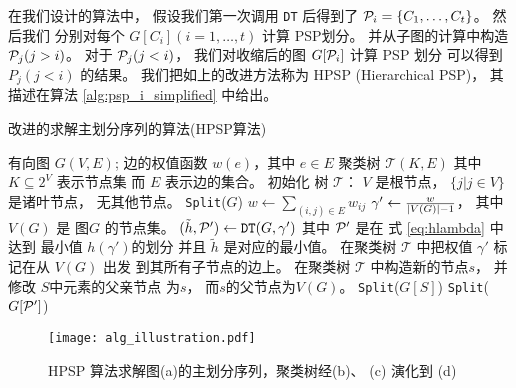 在我们设计的算法中，
假设我们第一次调用 \texttt{DT} 后得到了
$\P_i = \{C_1, \dots, C_t\}$。
然后我们 分别对每个
$G[C_i](i=1,\dots, t)$
计算 PSP划分。
并从子图的计算中构造 $\P_j(j>i)$。
对于 $\P_j(j<i)$，
我们对收缩后的图 $G[\P_i]$ 计算 PSP 划分
可以得到  $P_j(j<i)$ 的结果。
我们把如上的改进方法称为 HPSP (Hierarchical PSP)，
其描述在算法 \ref{alg:psp_i_simplified} 中给出。

\begin{algorithm}[!ht]
	\caption{改进的求解主划分序列的算法(HPSP算法)}\label{alg:psp_i_simplified}
	\begin{algorithmic}[1]
		\REQUIRE 有向图 $G(V, E)$; 边的权值函数 $w(e)$，其中 $e\in E$
		\ENSURE 聚类树 $\mathcal{T}(K, E)$ 其中 $K \subseteq 2^{V}$\footnotemark{} 表示节点集
    而 $E$ 表示边的集合。
		\STATE 初始化 树 $\mathcal{T}$：
     $V$ 是根节点，
     $\{j | j \in V\}$ 是诸叶节点，
     无其他节点。
		\STATE \texttt{Split}($G$)
		\STATE $w \gets \sum_{(i,j) \in E} w_{ij}$
		\STATE $\gamma' \gets \frac{w}{\abs{V(G)}-1}$，
    其中 $V(G)$ 是 图$G$
    的节点集。
    \label{alg:gamma_apostrophe}
		\STATE $(\tilde{h}, \P')
    \gets \texttt{DT}(G, \gamma')$ 其中
    $\P'$ 是在 式 \eqref{eq:hlambda} 中达到
    最小值 $h(\gamma')$的划分
    并且 $\tilde{h}$ 是对应的最小值。 \label{line:DT}
		\STATE 在聚类树
    $\mathcal{T}$ 中把权值 $\gamma'$ 标记在从 $V(G)$ 出发
    到其所有子节点的边上。
		\ELSE
		\STATE 在聚类树
    $\mathcal{T}$ 中构造新的节点$s$，
    并修改 $S$中元素的父亲节点 为$s$，
    而$s$的父节点为$V(G)$。
		\STATE \texttt{Split}($G[S]$) \label{line:SplitDown}
		\ENDFOR 
		\STATE \texttt{Split}($G[\P']$)		\label{line:SplitUp}
		\ENDIF
		\ENDFUNCTION
	\end{algorithmic}
\end{algorithm}

\begin{figure}[!ht]
	\centering
	\texttt{[image: alg\_illustration.pdf]}
	\caption{HPSP 算法求解图(a)的主划分序列，聚类树经(b)、 (c) 演化到 (d) }\label{fig:alg_eg}
\end{figure}

